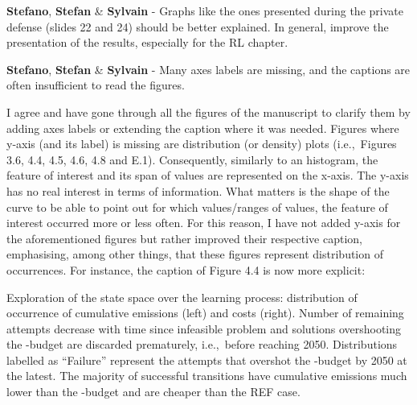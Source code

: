 \documentclass[12pt,a4paper]{article}
\def\ie{i.e.,\ }
\begin{document}
\begin{mdframed}[style=comment] %
{\color{orange} \textbf{Stefano}}, {\color{teal} \textbf{Stefan}} \& {\color{purple} \textbf{Sylvain}} - Graphs like the ones presented during the private defense (slides 22 and 24) should be better explained. In general, improve the presentation of the results, especially for the RL chapter.
\end{mdframed}

\noindent 

\begin{mdframed}[style=manuscript] %

\end{mdframed}

\begin{mdframed}[style=comment] %
{\color{orange} \textbf{Stefano}}, {\color{teal} \textbf{Stefan}} \& {\color{purple} \textbf{Sylvain}} - Many axes labels are missing, and the captions are often insufficient to read the figures. 
\end{mdframed}

\noindent I agree and have gone through all the figures of the manuscript to clarify them by adding axes labels or extending the caption where it was needed. Figures where y-axis (and its label) is missing are distribution (or density) plots (\ie Figures 3.6, 4.4, 4.5, 4.6, 4.8 and E.1).  Consequently, similarly to an histogram, the feature of interest and its span of values are represented on the x-axis. The y-axis has no real interest in terms of information. What matters is the shape of the curve to be able to point out for which values/ranges of values, the feature of interest occurred more or less often.  For this reason, I have not added y-axis for the aforementioned figures but rather improved their respective caption, emphasising, among other things, that these figures represent distribution of occurrences. For instance, the caption of {\color{blue}Figure 4.4} is now more explicit:

\begin{mdframed}[style=manuscript] %
Exploration of the state space over the learning process: distribution of occurrence of cumulative emissions (left) and costs (right). Number of remaining attempts decrease with time since infeasible problem and solutions overshooting the -budget are discarded prematurely, \ie before reaching 2050. Distributions labelled as ``Failure'' represent the attempts that overshot the -budget by 2050 at the latest. The majority of successful transitions have cumulative emissions much lower than the -budget and are cheaper than the REF case. 
\end{mdframed}
\end{document}
